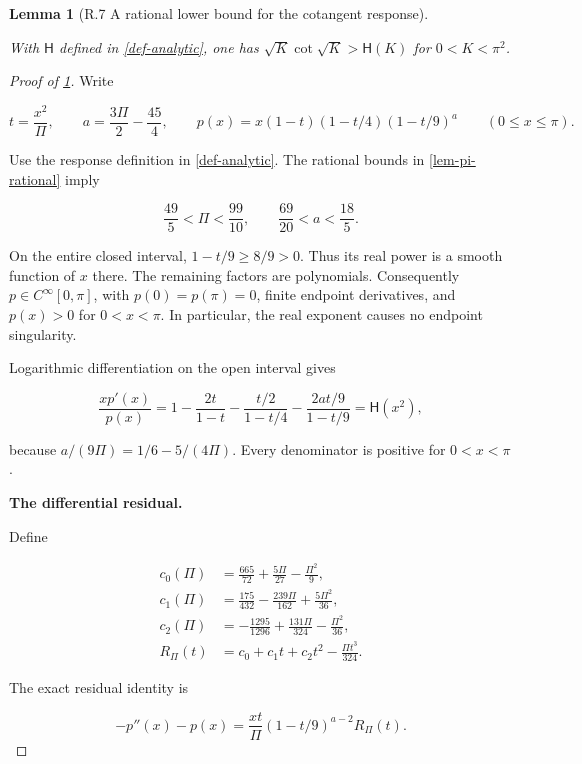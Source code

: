 \documentclass[11pt,a4paper]{article}
\theoremstyle{proofmanuscript}
\newtheorem{lemma}[theorem]{Lemma}
\begin{document}
\begin{lemma}[R.7 A rational lower bound for the cotangent response]\label{lem-cot-rational}

With \(\mathsf H\) defined in \ref{def-analytic}, one has \(\sqrt K\cot\sqrt K>\mathsf H(K)\) for \(0<K<\pi^2\).

\end{lemma}

\begin{proof}[Proof of \ref{lem-cot-rational}]

Write

\[
t=\frac{x^2}{\Pi},\qquad
a=\frac{3\Pi}{2}-\frac{45}{4},\qquad
p(x)=x(1-t)(1-t/4)(1-t/9)^a
\qquad(0\le x\le\pi).
\tag{R.7.1}
\]

Use the response definition in \ref{def-analytic}. The rational bounds in \ref{lem-pi-rational} imply

\[
\frac{49}{5}<\Pi<\frac{99}{10},\qquad
\frac{69}{20}<a<\frac{18}{5}.
\]

On the entire closed interval, \(1-t/9\ge8/9>0\). Thus its real power is a smooth function of \(x\) there. The remaining factors are polynomials. Consequently \(p\in C^\infty[0,\pi]\), with \(p(0)=p(\pi)=0\), finite endpoint derivatives, and \(p(x)>0\) for \(0<x<\pi\). In particular, the real exponent causes no endpoint singularity.

Logarithmic differentiation on the open interval gives

\[
\frac{xp'(x)}{p(x)}
=1-\frac{2t}{1-t}-\frac{t/2}{1-t/4}
-\frac{2at/9}{1-t/9}
=\mathsf H(x^2),
\tag{R.7.2}
\]

because \(a/(9\Pi)=1/6-5/(4\Pi)\). Every denominator is positive for \(0<x<\pi\).

\textbf{The differential residual.}

Define

\[
\begin{aligned}
c_0(\Pi)&=\frac{665}{72}+\frac{5\Pi}{27}-\frac{\Pi^2}{9},\\
c_1(\Pi)&=\frac{175}{432}-\frac{239\Pi}{162}+\frac{5\Pi^2}{36},\\
c_2(\Pi)&=-\frac{1295}{1296}+\frac{131\Pi}{324}-\frac{\Pi^2}{36},\\
R_\Pi(t)&=c_0+c_1t+c_2t^2-\frac{\Pi t^3}{324}.
\end{aligned}
\tag{R.7.3}
\]

The exact residual identity is

\[
-p''(x)-p(x)
=\frac{xt}{\Pi}(1-t/9)^{a-2}R_\Pi(t).
\tag{R.7.4}
\]


\end{proof}
\end{document}
